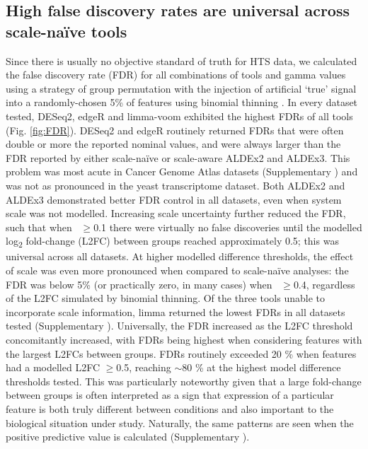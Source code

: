 \documentclass[10pt,letterpaper]{article}
\begin{document}
\subsection*{High false discovery rates are universal across scale-na\"ive tools}
Since there is usually no objective standard of truth for HTS data, we calculated the false discovery rate (FDR) for all combinations of tools and gamma values using a strategy of group permutation with the injection of artificial `true' signal into a randomly-chosen 5\% of features using binomial thinning \cite{gerard_data-based_2020}. In every dataset tested, DESeq2, edgeR and limma-voom exhibited the highest FDRs of all tools (Fig. \ref{fig:FDR}). DESeq2 and edgeR routinely returned FDRs that were often double or more the reported nominal values, and were always larger than the FDR reported by either scale-na\"ive or scale-aware ALDEx2 and ALDEx3. This problem was most acute in Cancer Genome Atlas datasets (Supplementary ) and was not as pronounced in the yeast transcriptome dataset. Both ALDEx2 and ALDEx3 demonstrated better FDR control in all datasets, even when system scale was not modelled. Increasing scale uncertainty further reduced the FDR, such that when \textgamma~$\geq$0.1 there were virtually no false discoveries until the modelled log\textsubscript{2} fold-change (L2FC) between groups reached approximately 0.5; this was universal across all datasets. At higher modelled difference thresholds, the effect of scale was even more pronounced when compared to scale-na\"ive analyses: the FDR was below 5\% (or practically zero, in many cases) when \textgamma~$\geq$0.4, regardless of the L2FC simulated by binomial thinning. Of the three tools unable to incorporate scale information, limma returned the lowest FDRs in all datasets tested (Supplementary ). Universally, the FDR increased as the L2FC threshold concomitantly increased, with FDRs being highest when considering features with the largest L2FCs between groups. FDRs routinely exceeded 20 \% when features had a modelled L2FC $\geq$0.5, reaching $\sim$80 \% at the highest model difference thresholds tested. This was particularly noteworthy given that a large fold-change between groups is often interpreted as a sign that expression of a particular feature is both truly different between conditions and also important to the biological situation under study. Naturally, the same patterns are seen when the positive predictive value is calculated (Supplementary ).
\end{document}
